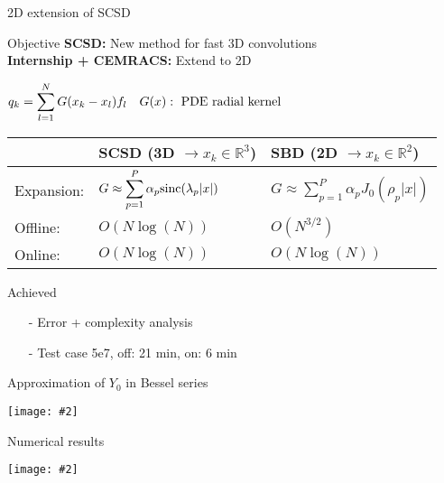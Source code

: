 \documentclass[11pt]{beamer}
\begin{document}
\begin{frame}{2D extension of SCSD}

\begin{block}{Objective}
\textbf{SCSD:} New method for fast 3D convolutions \\
\textbf{Internship + CEMRACS: } Extend to 2D
\end{block}
\begin{center}
$q_k = \displaystyle\sum_{l=1}^N G(x_k-x_l)f_l \quad G(x): \textup{ PDE radial kernel }$
\end{center}
\begin{tabular}{l | l | l}
 & SCSD (3D $\rightarrow x_k \in \mathbb{R}^3$) & SBD (2D $\rightarrow x_k \in \mathbb{R}^2$) \\
\hline \hline
Expansion: & $G \approx \displaystyle\sum_{p=1}^P \alpha_p \textup{sinc}(\lambda_p|x|)$ & $G \approx \displaystyle\sum_{p=1}^P \alpha_p J_0(\rho_p |x|)$ \\ 
Offline: & $O(N\log(N))$ & $O(N^{3/2})$ \\ 
Online: & $O(N\log(N))$ &$O(N\log(N))$ \\ 
\end{tabular}

\begin{block}{Achieved}
\begin{itemize}
\item[-] Error + complexity analysis
\item[-] Test case 5e7, off: 21 min, on: 6 min
\end{itemize}
\end{block}


\end{frame}
\newcommand {\framedgraphic}[2] {
    \begin{frame}{#1}
        \begin{center}
            \texttt{[image: \#2]}
        \end{center}
    \end{frame}
}

\framedgraphic{Approximation of $Y_0$ in Bessel series}{CEMRACSSlide3.png}
\framedgraphic{Numerical results}{NumericalResultsslideCEMRACS.png}
\end{document}

